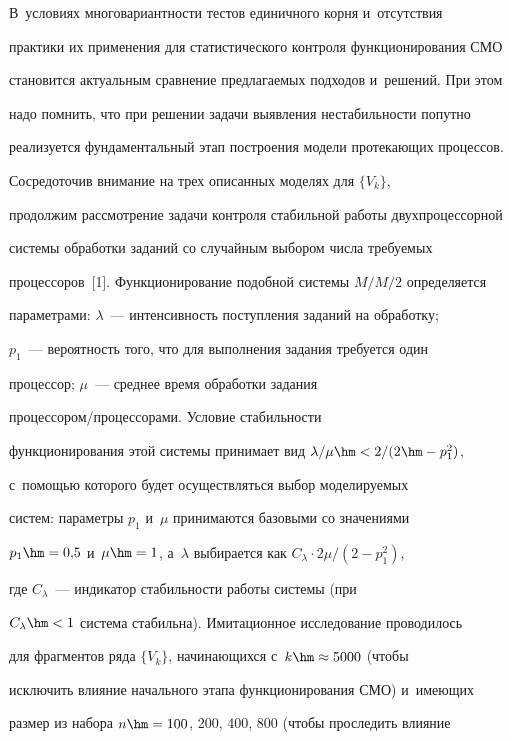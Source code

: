      В~условиях многовариантности тестов единичного корня и~отсутствия 


практики их применения для статистического контроля функционирования СМО 


становится актуальным сравнение пред\-ла\-га\-емых подходов и~решений. При этом 


надо помнить, что при решении задачи выявления не\-ста\-биль\-ности попутно 


реализуется фундаментальный этап по\-стро\-ения модели про\-те\-ка\-ющих процессов. 


     


     Сосредоточив внимание на трех описанных моделях для $\{V_k\}$, 


продолжим рассмотрение задачи контроля стабильной работы двухпроцессорной 


сис\-те\-мы обработки заданий со случайным выбором числа требуемых 


процессоров~[1]. Функционирование подобной сис\-те\-мы $M/M/2$ определяется 


параметрами: $\lambda$~--- ин\-тен\-сив\-ность по\-ступ\-ле\-ния заданий на обработку; 


$p_1$~--- ве\-ро\-ят\-ность того, что для выполнения задания требуется один 


процессор; $\mu$~--- сред\-нее время обработки задания  


про\-цес\-со\-ром\!/\!про\-цес\-со\-ра\-ми. Условие ста\-биль\-ности 


функционирования этой сис\-те\-мы принимает вид $\lambda/\mu \hm< 2/(2\hm- p_1^2)$, 


с~по\-мощью которого будет осуществляться выбор мо\-де\-ли\-ру\-емых  


сис\-тем: па\-ра\-мет\-ры $p_1$ и~$\mu$ принимаются базовыми со значениями 


$p_1\hm= 0{,}5$ и~$\mu\hm=1$, а~$\lambda$ выбирается как $C_\lambda \cdot 2\mu/(2-p_1^2)$, 


где $C_\lambda$~--- индикатор ста\-биль\-ности работы сис\-те\-мы (при 


$C_\lambda\hm<1$ сис\-те\-ма стабильна). Имитационное исследование проводилось 


для фрагментов ряда $\{V_k\}$, на\-чи\-на\-ющих\-ся с~$k\hm\approx 5000$ (чтобы 


исключить влияние начального этапа функционирования СМО) и~име\-ющих 


размер из набора $n\hm= 100$, 200, 400, 800 (чтобы проследить влияние 


